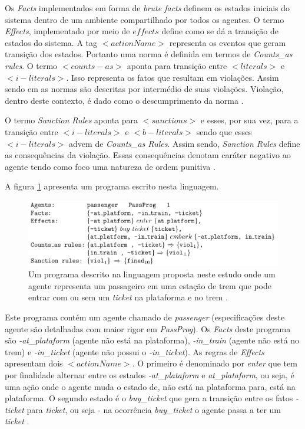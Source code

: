 Os \textit{Facts} implementados em forma de \textit{brute facts} definem os estados iniciais do sistema dentro de um ambiente compartilhado por todos os agentes. O termo \textit{Effects}, implementado por meio de $effects$ define como se dá a transição de estados do sistema. A tag $<actionName>$ representa os eventos que geram transição dos estados. Portanto uma norma é definida em termos de \textit{Counts\_as rules}. O termo $<counts-as>$ aponta para transição entre $<literals>$ e $<i-literals>$. Isso representa os fatos que resultam em violações. Assim sendo em \cite{dastaniframework} as normas são descritas por intermédio de suas violações. Violação, dentro deste contexto, é dado como o descumprimento da norma \cite{ontologynormative}.

O termo \textit{Sanction Rules} aponta para $<sanctions>$ e esses, por sua vez, para a transição entre $<i-literals>$ e $<b-literals>$ sendo que esses $<i-literals>$ advem de \textit{Counts\_as Rules}. Assim sendo, \textit{Sanction Rules} define as consequências da violação. Essas consequências denotam caráter negativo ao agente tendo como foco uma natureza de ordem punitiva \cite{dastaniframework}. 

A figura \ref{exemploprograma} apresenta um programa escrito nesta linguagem. 

\begin{figure}[H]
  \centering
  \includegraphics[width=0.8\linewidth]{figure/programdastani.png} 
  \caption{Um programa descrito na linguagem proposta neste estudo onde um agente representa um passageiro em uma estação de trem que pode entrar com ou sem um \textit{ticket} na plataforma e no trem \cite{dastaniframework}.}
  \label{exemploprograma}
\end{figure}

Este programa contém um agente chamado de \textit{passenger} (especificações deste agente são detalhadas com maior rigor em \textit{PassProg}). Os \textit{Facts} deste programa são \textit{-at\_plataform} (agente não está na plataforma), \textit{-in\_train} (agente não está no trem) e \textit{-in\_ticket} (agente não possui o \textit{-in\_ticket}). As regras de \textit{Effects} apresentam dois $<actionName>$. O primeiro é denominado por \textit{enter} que tem por finalidade alternar entre os estados \textit{-at\_plataform} e \textit{at\_plataform}, 
ou seja, é uma ação onde o agente muda o estado de, não está na plataforma para, está na plataforma. O segundo estado é o \textit{buy\_ticket} que gera a transição entre os fatos \textit{-ticket} para \textit{ticket}, ou seja - na ocorrência \textit{buy\_ticket} o agente passa a ter um \textit{ticket} \cite{dastaniframework}.

